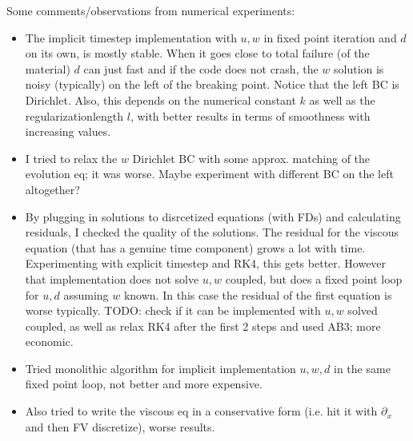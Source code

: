 \documentclass[11pt,a4paper]{article}
\newcommand{\p}{\partial}
\newcommand{\bb}[1]{\boldsymbol{#1}}
\begin{document}
Some comments/observations from numerical experiments:
\begin{itemize}
    \item The implicit timestep implementation with $u,w$ in fixed point iteration and $d$ on its own, is mostly stable. When it goes close to total failure (of the material) $d$ can just fast and if the code does not crash, the $w$ solution is noisy (typically) on the left of the breaking point. Notice that the left BC is Dirichlet. Also, this depends on the numerical constant $k$ as well as the regularizationlength $l$, with better results in terms of smoothness with increasing values.
    \item I tried to relax the $w$ Dirichlet BC with some approx. matching of the evolution eq; it was worse. Maybe experiment with different BC on the left altogether?
    \item By plugging in solutions to disrcetized equations (with FDs) and calculating residuals, I checked the quality of the solutions. The residual for the viscous equation (that has a genuine time component) grows a lot with time. Experimenting with explicit timestep and RK4, this gets better. However that implementation does not solve $u,w$ coupled, but does a fixed point loop for $u,d$ assuming $w$ known. In this case the residual of the first equation is worse typically. TODO: check if it can be implemented with $u,w$ solved coupled, as well as relax RK4 after the first 2 steps and used AB3; more economic.
    \item Tried monolithic algorithm for implicit implementation $u,w,d$ in the same fixed point loop, not better and more expensive.
    \item Also tried to write the viscous eq in a conservative form (i.e. hit it with $\p_x$ and then FV discretize), worse results.
\end{itemize}



\end{document}
